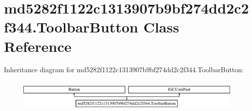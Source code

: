 \hypertarget{classmd5282f1122c1313907b9bf274dd2c2f344_1_1ToolbarButton}{}\section{md5282f1122c1313907b9bf274dd2c2f344.\+Toolbar\+Button Class Reference}
\label{classmd5282f1122c1313907b9bf274dd2c2f344_1_1ToolbarButton}
Inheritance diagram for md5282f1122c1313907b9bf274dd2c2f344.\+Toolbar\+Button\+:\begin{figure}[H]
\begin{center}
\leavevmode
\includegraphics[height=1.647059cm]{classmd5282f1122c1313907b9bf274dd2c2f344_1_1ToolbarButton}
\end{center}
\end{figure}
